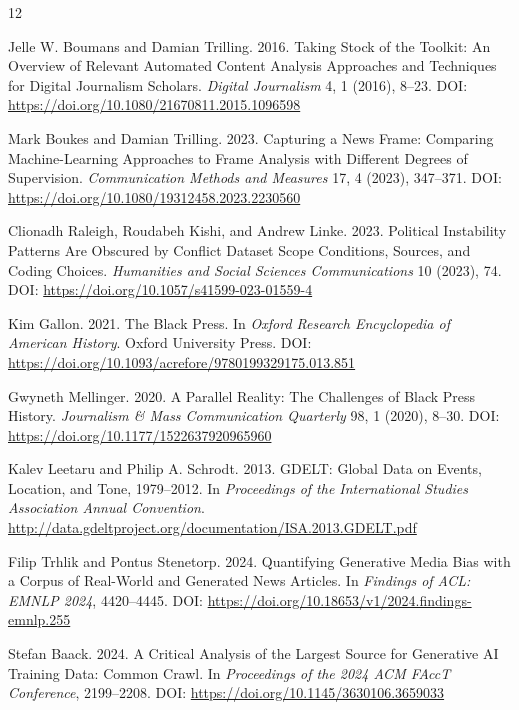 \documentclass[sigconf,anonymous]{acmart}
\begin{document}

\begin{thebibliography}{12}

Jelle W. Boumans and Damian Trilling. 2016.
Taking Stock of the Toolkit: An Overview of Relevant Automated Content Analysis
Approaches and Techniques for Digital Journalism Scholars.
\textit{Digital Journalism} 4, 1 (2016), 8--23.
DOI: \url{https://doi.org/10.1080/21670811.2015.1096598}

Mark Boukes and Damian Trilling. 2023.
Capturing a News Frame: Comparing Machine-Learning Approaches to Frame Analysis
with Different Degrees of Supervision.
\textit{Communication Methods and Measures} 17, 4 (2023), 347--371.
DOI: \url{https://doi.org/10.1080/19312458.2023.2230560}

Clionadh Raleigh, Roudabeh Kishi, and Andrew Linke. 2023.
Political Instability Patterns Are Obscured by Conflict Dataset Scope Conditions,
Sources, and Coding Choices.
\textit{Humanities and Social Sciences Communications} 10 (2023), 74.
DOI: \url{https://doi.org/10.1057/s41599-023-01559-4}

Kim Gallon. 2021.
The Black Press.
In \textit{Oxford Research Encyclopedia of American History}.
Oxford University Press.
DOI: \url{https://doi.org/10.1093/acrefore/9780199329175.013.851}

Gwyneth Mellinger. 2020.
A Parallel Reality: The Challenges of Black Press History.
\textit{Journalism \& Mass Communication Quarterly} 98, 1 (2020), 8--30.
DOI: \url{https://doi.org/10.1177/1522637920965960}

Kalev Leetaru and Philip A. Schrodt. 2013.
GDELT: Global Data on Events, Location, and Tone, 1979--2012.
In \textit{Proceedings of the International Studies Association Annual Convention}.
\url{http://data.gdeltproject.org/documentation/ISA.2013.GDELT.pdf}

Filip Trhlik and Pontus Stenetorp. 2024.
Quantifying Generative Media Bias with a Corpus of Real-World and Generated
News Articles.
In \textit{Findings of ACL: EMNLP 2024}, 4420--4445.
DOI: \url{https://doi.org/10.18653/v1/2024.findings-emnlp.255}

Stefan Baack. 2024.
A Critical Analysis of the Largest Source for Generative AI Training Data:
Common Crawl.
In \textit{Proceedings of the 2024 ACM FAccT Conference}, 2199--2208.
DOI: \url{https://doi.org/10.1145/3630106.3659033}


\end{thebibliography}
\end{document}
